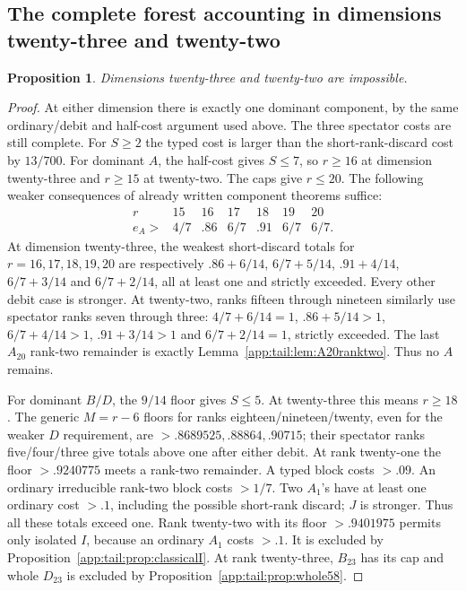 \documentclass[11pt]{article}
\newtheorem{proposition}[theorem]{Proposition}
\theoremstyle{definition}
\theoremstyle{remark}
\begin{document}
\subsection{The complete forest accounting in dimensions twenty-three and twenty-two}
\label{app:tail:23and22}
\begin{proposition}
\label{app:tail:prop:23and22}
Dimensions twenty-three and twenty-two are impossible.
\end{proposition}
\begin{proof}
At either dimension there is exactly one dominant component, by the
same ordinary/debit and half-cost argument used above. The three
spectator costs are still complete. For $S\ge2$ the typed cost is
larger than the short-rank-discard cost by $13/700$.
For dominant $A$, the half-cost gives $S\le7$, so $r\ge16$ at
dimension twenty-three and $r\ge15$ at twenty-two. The caps give
$r\le20$. The following weaker consequences of already written
component theorems suffice:
\[
\begin{array}{c|cccccc}
r&15&16&17&18&19&20\\ \hline
e_A>&4/7&.86&6/7&.91&6/7&6/7.
\end{array}
\]
At dimension twenty-three, the weakest short-discard totals for
$r=16,17,18,19,20$ are respectively
$ .86+6/14$, $6/7+5/14$, $.91+4/14$, $6/7+3/14$ and
$6/7+2/14$, all at least one and strictly exceeded. Every other
debit case is stronger. At twenty-two, ranks fifteen through
nineteen similarly use spectator ranks seven through three:
$4/7+6/14=1$, $.86+5/14>1$, $6/7+4/14>1$,
$.91+3/14>1$ and $6/7+2/14=1$, strictly exceeded.
The last $A_{20}$ rank-two remainder is exactly
Lemma~\ref{app:tail:lem:A20ranktwo}. Thus no $A$ remains.

For dominant $B/D$, the $9/14$ floor gives $S\le5$.
At twenty-three this means $r\ge18$. The generic $M=r-6$
floors for ranks eighteen/nineteen/twenty, even for the weaker $D$
requirement, are $>.8689525,.88864,.90715$; their spectator ranks
five/four/three give totals above one after either debit.
At rank twenty-one the floor $>.9240775$ meets a rank-two remainder.
A typed block costs $>.09$. An ordinary irreducible rank-two block
costs $>1/7$. Two $A_1$'s have at least one ordinary cost $>.1$,
including the possible short-rank discard; $J$ is stronger. Thus all
these totals exceed one. Rank twenty-two with its floor $>.9401975$
permits only isolated $I$, because an ordinary $A_1$ costs $>.1$.
It is excluded by Proposition~\ref{app:tail:prop:classicalI}.
At rank twenty-three, $B_{23}$ has its cap and whole $D_{23}$ is
excluded by Proposition~\ref{app:tail:prop:whole58}.


\end{proof}
\end{document}
